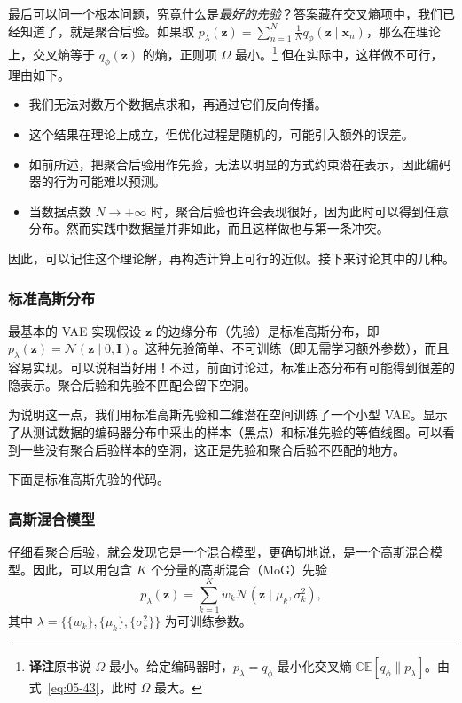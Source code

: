 最后可以问一个根本问题，究竟什么是\emph{最好的先验}？答案藏在交叉熵项中，我们已经知道了，就是聚合后验。如果取 $p_\lambda(\mathbf{z})=\sum_{n=1}^N\frac{1}{N}q_\phi(\mathbf{z}\mid\mathbf{x}_n)$，那么在理论上，交叉熵等于 $q_\phi(\mathbf{z})$ 的熵，正则项 $\Omega$ 最小。\footnote{\textbf{译注}\quad 原书说 $\Omega$ 最小。给定编码器时，$p_\lambda=q_\phi$ 最小化交叉熵 $\mathbb{CE}[q_\phi\|p_\lambda]$。由式~\eqref{eq:05-43}，此时 $\Omega$ 最大。} 但在实际中，这样做不可行，理由如下。
\begin{itemize}
\item 我们无法对数万个数据点求和，再通过它们反向传播。
\item 这个结果在理论上成立，但优化过程是随机的，可能引入额外的误差。
\item 如前所述，把聚合后验用作先验，无法以明显的方式约束潜在表示，因此编码器的行为可能难以预测。
\item 当数据点数 $N\to+\infty$ 时，聚合后验也许会表现很好，因为此时可以得到任意分布。然而实践中数据量并非如此，而且这样做也与第一条冲突。
\end{itemize}
因此，可以记住这个理论解，再构造计算上可行的近似。接下来讨论其中的几种。

\subsubsection{标准高斯分布}
最基本的 VAE 实现假设 $\mathbf{z}$ 的边缘分布（先验）是标准高斯分布，即 $p_\lambda(\mathbf{z})=\mathcal{N}(\mathbf{z}\mid 0,\mathbf{I})$。这种先验简单、不可训练（即无需学习额外参数），而且容易实现。可以说相当好用！不过，前面讨论过，标准正态分布有可能得到很差的隐表示。聚合后验和先验不匹配会留下空洞。

为说明这一点，我们用标准高斯先验和二维潜在空间训练了一个小型 VAE。显示了从测试数据的编码器分布中采出的样本（黑点）和标准先验的等值线图。可以看到一些没有聚合后验样本的空洞，这正是先验和聚合后验不匹配的地方。


下面是标准高斯先验的代码。

\subsubsection{高斯混合模型}
仔细看聚合后验，就会发现它是一个混合模型，更确切地说，是一个高斯混合模型。因此，可以用包含 $K$ 个分量的高斯混合（MoG）先验
\begin{equation}
p_\lambda(\mathbf{z})=\sum_{k=1}^K w_k\mathcal{N}(\mathbf{z}\mid\mu_k,\sigma_k^2),
\tag{5.47}\label{eq:05-47}
\end{equation}
其中 $\lambda=\bigl\{\{w_k\},\{\mu_k\},\{\sigma_k^2\}\bigr\}$ 为可训练参数。

